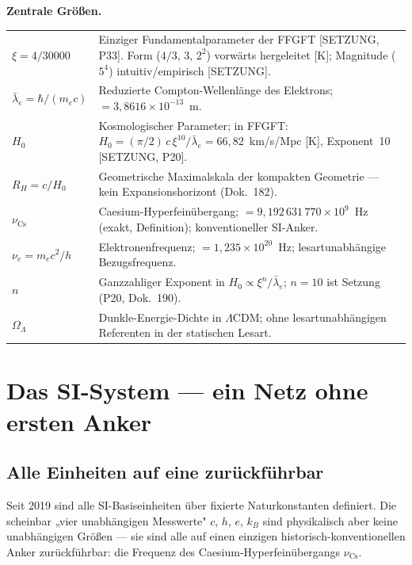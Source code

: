 \medskip
\noindent\textbf{Zentrale Größen.}

\medskip
\begin{tabular}{@{}lp{10.5cm}}
$\xi = 4/30000$
  & Einziger Fundamentalparameter der FFGFT [SETZUNG, P33].
    Form ($4/3$, $3$, $2^2$) vorwärts hergeleitet [K];
    Magnitude ($5^4$) intuitiv/empirisch [SETZUNG]. \\[4pt]
$\bar\lambda_e = \hbar/(m_e c)$
  & Reduzierte Compton-Wellenlänge des Elektrons;
    $= 3{,}8616\times10^{-13}$~m. \\[4pt]
$H_0$
  & Kosmologischer Parameter; in FFGFT:
    $H_0 = (\pi/2)\,c\,\xi^{10}/\bar\lambda_e = 66{,}82$~km/s/Mpc
    [K], Exponent~10 [SETZUNG, P20]. \\[4pt]
$R_H = c/H_0$
  & Geometrische Maximalskala der kompakten Geometrie —
    kein Expansionshorizont (Dok.~182). \\[4pt]
$\nu_\text{Cs}$
  & Caesium-Hyperfeinübergang; $= 9{,}192\,631\,770\times10^9$~Hz
    (exakt, Definition); konventioneller SI-Anker. \\[4pt]
$\nu_e = m_e c^2/h$
  & Elektronenfrequenz; $= 1{,}235\times10^{20}$~Hz;
    lesartunabhängige Bezugsfrequenz. \\[4pt]
$n$
  & Ganzzahliger Exponent in $H_0 \propto \xi^n/\bar\lambda_e$;
    $n = 10$ ist Setzung (P20, Dok.~190). \\[4pt]
$\Omega_\Lambda$
  & Dunkle-Energie-Dichte in $\Lambda$CDM;
    ohne lesartunabhängigen Referenten in der statischen Lesart. \\
\end{tabular}

\chapter{Das SI-System — ein Netz ohne ersten Anker}

\section{Alle Einheiten auf eine zurückführbar}

Seit 2019 sind alle SI-Basiseinheiten über fixierte Naturkonstanten
definiert. Die scheinbar „vier unabhängigen Messwerte" $c$, $h$, $e$,
$k_B$ sind physikalisch aber keine unabhängigen Größen — sie sind alle
auf einen einzigen historisch-konventionellen Anker zurückführbar:
die Frequenz des Caesium-Hyperfeinübergangs $\nu_\text{Cs}$.

